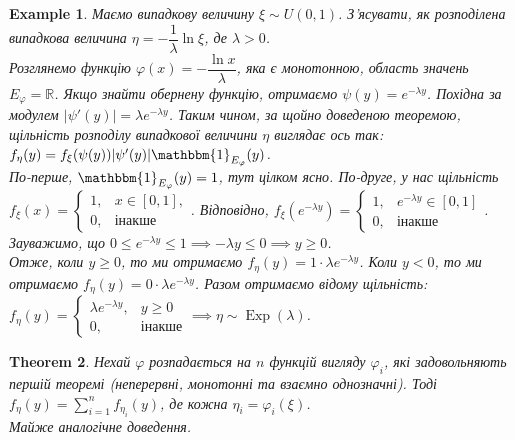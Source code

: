 \documentclass[a4paper, 10pt]{article}
\theoremstyle{theoremdd}
\newtheorem{theorem}{Theorem}[subsection]
\newtheorem{example}[theorem]{Example}
\DeclareMathOperator{\Exp}{Exp}
\begin{document}
\begin{example}
Маємо випадкову величину $\xi \sim U(0,1)$. З'ясувати, як розподілена випадкова величина $\eta = -\dfrac{1}{\lambda} \ln \xi$, де $\lambda > 0$.\\
Розглянемо функцію $\varphi(x) = -\dfrac{\ln x}{\lambda}$, яка є монотонною, область значень $E_\varphi = \mathbb{R}$. Якщо знайти обернену функцію, отримаємо $\psi(y) = e^{-\lambda y}$. Похідна за модулем $|\psi'(y)| = \lambda e^{-\lambda y}$. Таким чином, за щойно доведеною теоремою, щільність розподілу випадкової величини $\eta$ виглядає ось так:\\
$f_\eta(y) = f_\xi(\psi(y)) |\psi'(y)| \mathbbm{1}_{E_\varphi}(y)$.\\
По-перше, $\mathbbm{1}_{E_\varphi}(y) = 1$, тут цілком ясно. По-друге, у нас щільність $f_\xi(x) = \begin{cases} 1, & x \in [0,1], \\ 0, & \text{інакше} \end{cases}$. Відповідно, $f_\xi(e^{-\lambda y}) = \begin{cases} 1, & e^{-\lambda y} \in [0,1] \\ 0, & \text{інакше} \end{cases}$. Зауважимо, що $0 \leq e^{-\lambda y} \leq 1 \implies -\lambda y \leq 0 \implies y \geq 0$.\\
Отже, коли $y \geq 0$, то ми отримаємо $f_\eta(y) = 1 \cdot \lambda e^{-\lambda y}$. Коли $y < 0$, то ми отримаємо $f_\eta(y) = 0 \cdot \lambda e^{-\lambda y}$. Разом отримаємо відому щільність:\\
$f_\eta(y) = \begin{cases} \lambda e^{-\lambda y}, & y \geq 0 \\ 0, & \text{інакше} \end{cases} \implies \eta \sim \Exp(\lambda)$.
\end{example}

\begin{theorem}
Нехай $\varphi$ розпадається на $n$ функцій вигляду $\varphi_i$, які задовольняють першій теоремі (неперервні, монотонні та взаємно однозначні). Тоді $f_\eta(y) = \displaystyle\sum_{i=1}^n f_{\eta_i}(y)$, де кожна $\eta_i = \varphi_i(\xi)$.\\
\textit{Майже аналогічне доведення.}
\end{theorem}
\end{document}
